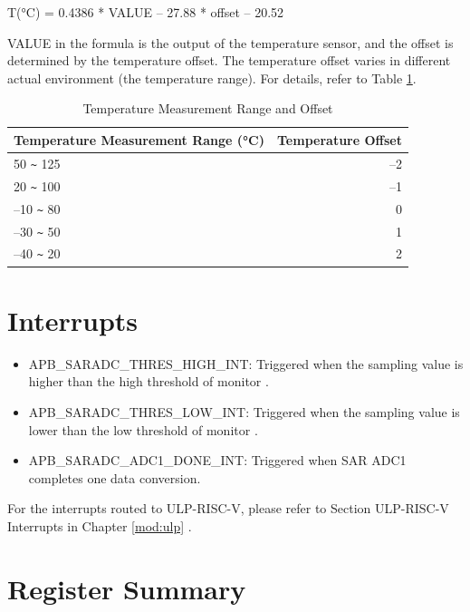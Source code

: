 \documentclass[main\_\_EN.tex]{subfiles}
\begin{document}
\begin{centering}
        T(°C) = 0.4386 * VALUE – 27.88 * offset – 20.52\\
\end{centering}

VALUE in the formula is the output of the temperature sensor, and the offset is determined by the temperature offset. The temperature offset varies in different actual environment (the temperature range). For details, refer to Table \ref{tab:tsensor-dac}.

\begin{longtable}[c]{|l|r|}
    \caption{Temperature Measurement Range and Offset}
    \label{tab:tsensor-dac}
    \\\hline
    \rowcolor{lightgray}
    \textbf{Temperature Measurement Range (°C)}   & \textbf{Temperature Offset} \\\hline
    50 \verb+~+ 125 &  –2 \\\hline
    20 \verb+~+ 100 &  –1 \\\hline
    –10 \verb+~+ 80 &  0 \\\hline
    –30 \verb+~+ 50 &  1 \\\hline
    –40 \verb+~+ 20 &  2 \\\hline
\end{longtable}

\section{Interrupts}

\begin{itemize}
   \item \label{interreupt:APBSARADCTHRESxHIGHINT} APB\_SARADC\_THRES\_HIGH\_INT: Triggered when the sampling value is higher than the high threshold of monitor .
    \item \label{interreupt:APBSARADCTHRESxLOWINT} APB\_SARADC\_THRES\_LOW\_INT: Triggered when the sampling value is lower than the low threshold of monitor .
   \item \label{interreupt:SARADCDONEINT1}APB\_SARADC\_ADC1\_DONE\_INT: Triggered when SAR ADC1 completes one data conversion.
\end{itemize}
For the interrupts routed to ULP-RISC-V, please refer to Section ULP-RISC-V Interrupts in Chapter \ref{mod:ulp} \textit{}.

\hypertarget{sensor-reg-summ}{}
\section{Register Summary}
\end{document}
